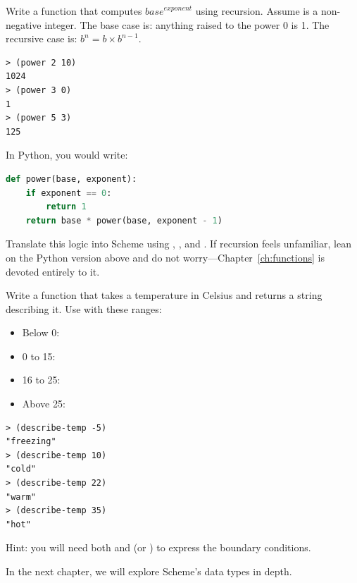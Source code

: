 \begin{exercise}
Write a function  that computes $\mathit{base}^{\mathit{exponent}}$ using recursion. Assume  is a non-negative integer. The base case is: anything raised to the power 0 is 1. The recursive case is: $b^n = b \times b^{n-1}$.

\begin{lstlisting}[style=repl]
> (power 2 10)
1024
> (power 3 0)
1
> (power 5 3)
125
\end{lstlisting}

In Python, you would write:

\begin{lstlisting}[language=Python, style=scheme, keywordstyle=\bfseries]
def power(base, exponent):
    if exponent == 0:
        return 1
    return base * power(base, exponent - 1)
\end{lstlisting}

Translate this logic into Scheme using , \code{=}, and \code{-}. If recursion feels unfamiliar, lean on the Python version above and do not worry---Chapter~\ref{ch:functions} is devoted entirely to it.
\end{exercise}

\begin{exercise}
Write a function  that takes a temperature in Celsius and returns a string describing it. Use  with these ranges:

\begin{itemize}
    \item Below 0: 
    \item 0 to 15: 
    \item 16 to 25: 
    \item Above 25: 
\end{itemize}

\begin{lstlisting}[style=repl]
> (describe-temp -5)
"freezing"
> (describe-temp 10)
"cold"
> (describe-temp 22)
"warm"
> (describe-temp 35)
"hot"
\end{lstlisting}

Hint: you will need both \code{<} and \code{<=} (or \code{>=}) to express the boundary conditions.
\end{exercise}

In the next chapter, we will explore Scheme's data types in depth.

\chapterend
